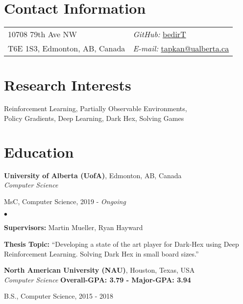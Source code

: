 \documentclass[margin,line]{res}
\newenvironment{list1}{
  \begin{list}{\ding{113}}{%
      \setlength{\itemsep}{0in}
      \setlength{\parsep}{0in} \setlength{\parskip}{0in}
      \setlength{\topsep}{0in} \setlength{\partopsep}{0in} 
      \setlength{\leftmargin}{0.17in}}}{\end{list}}
\newenvironment{list2}{
  \begin{list}{$\bullet$}{%
      \setlength{\itemsep}{0in}
      \setlength{\parsep}{0in} \setlength{\parskip}{0in}
      \setlength{\topsep}{0in} \setlength{\partopsep}{0in} 
      \setlength{\leftmargin}{0.2in}}}{\end{list}}
\begin{document}

\begin{resume}
\section{\sc Contact Information}
\vspace{.05in}
\begin{tabular}{@{}p{3in}p{3in}}
10708 79th Ave NW & \hfill {\it GitHub:}  \href{https://github.com/bedirT}{bedirT} \\
T6E 1S3, Edmonton, AB, Canada & \hfill {\it E-mail:}  \href{mailto:tapkan@ualberta.ca}{tapkan@ualberta.ca}\\
\end{tabular}


\section{\sc Research Interests}
Reinforcement Learning, 
Partially Observable Environments, \\
Policy Gradients, 
Deep Learning,
Dark Hex, 
Solving Games

\section{\sc Education}

 {\bf University of Alberta (UofA)}, Edmonton, AB, Canada\\
 {\em Computer Science} 
 \begin{list1}
 \item[] MsC, Computer Science, 2019 - \textit{Ongoing}
\end{list1}
\begin{list2}
\vspace*{.05in}
\item {\bf Supervisors:}  Martin Mueller, Ryan Hayward
\item {\bf Thesis Topic:}  ``Developing a state of the art player for Dark-Hex using Deep Reinforcement Learning. Solving Dark Hex in small board sizes.''
\end{list2}

{\bf North American University (NAU)}, Houston, Texas, USA\\
{\em Computer Science}  \hfill {\bf Overall-GPA: 3.79 - Major-GPA: 3.94}\\
\vspace{-.3cm}
\begin{list1}
\item[] B.S., Computer Science,  2015 - 2018
\end{list1}



\end{resume}
\end{document}
